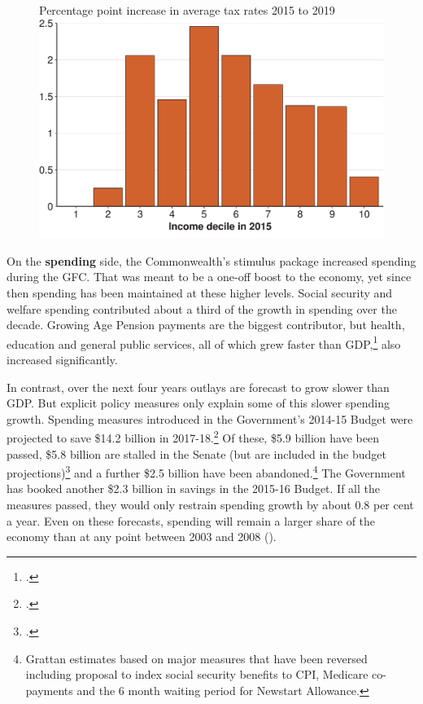 \begin{figure}
%
{Percentage point increase in average tax rates 2015 to 2019}
\includegraphics[width=\columnwidth]{Fiscal-challenges/figure/Figure4-1.pdf}
\end{figure}

On the \textbf{spending} side, the Commonwealth’s stimulus package increased spending during the GFC\@. That was meant to be a one-off boost to the economy, yet since then spending has been maintained at these higher levels. Social security and welfare spending contributed about a third of the growth in spending over the decade. Growing Age Pension payments are the biggest contributor, but health, education and general public services, all of which grew faster than GDP,\footcites[][7--8]{PBO2013}[][20--23]{DaleyWoodWeidmannEtAl2014}  also increased significantly. 

In contrast, over the next four years outlays are forecast to grow slower than GDP\@. But explicit policy measures only explain some of this slower spending growth. Spending measures introduced in the Government’s 2014-15 Budget were projected to save \$14.2 billion in 2017-18.\footcite[][BP~No.~2, p~47]{Treasury2015BudgetPapers201516}  Of these, \$5.9 billion have been passed, \$5.8 billion are stalled in the Senate (but are included in the budget projections)\footcite{PBO2015f}  and a further \$2.5 billion have been abandoned.\footnote{Grattan estimates based on major measures that have been reversed including proposal to index social security benefits to CPI, Medicare co-payments and the 6 month waiting period for Newstart Allowance.}  The Government has booked another \$2.3 billion in savings in the 2015-16 Budget. If all the measures passed, they would only restrain spending growth by about 0.8 per cent a year.  Even on these forecasts, spending will remain a larger share of the economy than at any point between 2003 and 2008 ().

